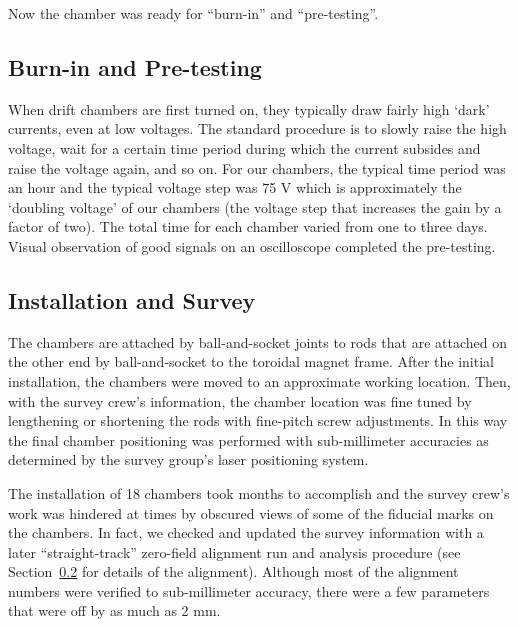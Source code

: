Now the chamber was ready for ``burn-in'' and ``pre-testing''.

\subsection{Burn-in and Pre-testing}
When drift chambers are first turned on, they typically draw fairly high
`dark' currents, even at low voltages.  The standard procedure is to
slowly raise the high voltage, wait for a certain time period during
which the current subsides and raise the voltage again, and so on.
For our chambers, the typical time period was an hour and the typical
voltage step was 75 V which is approximately the `doubling voltage' of
our chambers (the voltage step that increases the gain by a factor
of two).  The total time for each chamber varied from one to three days.
Visual observation of good signals on an oscilloscope completed
the pre-testing.

\subsection{Installation and Survey}

The chambers are attached by ball-and-socket joints to rods that are attached
on the other end by ball-and-socket to the toroidal magnet frame.
After the initial installation, the chambers were moved to an approximate
working location.  Then, with the survey crew's information, the chamber location
was fine tuned by lengthening or shortening the rods with fine-pitch screw adjustments.
In this way the final chamber positioning was performed with sub-millimeter accuracies as
determined by the survey group's laser positioning system.

The installation of 18 chambers took months to accomplish and the survey crew's work
was hindered at times by obscured views of some of the fiducial marks on the 
chambers.  In fact, we checked and updated the survey information with a later 
``straight-track'' zero-field alignment run and analysis procedure (see Section~\ref{} for
details of the alignment).
Although most of the alignment numbers were verified to sub-millimeter accuracy, there
were a few parameters that were off by as much as 2 mm.

